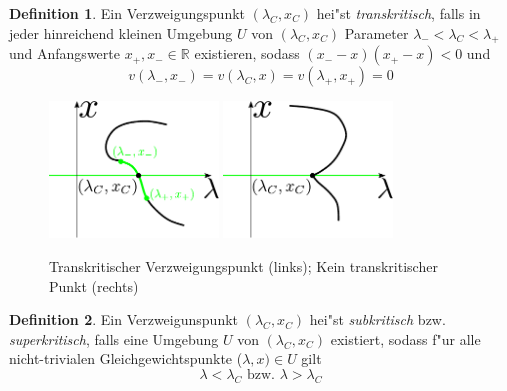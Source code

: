 \documentclass[a4paper, 13pt]{scrreprt}
\theoremstyle{definition} \newtheorem{definition}{Definition}[section]
\newcommand{\RR}{\mathbb{R}}
\begin{document}
\begin{definition}
Ein Verzweigungspunkt $(\lambda_C, x_C)$ hei"st \emph{transkritisch}, falls in jeder hinreichend kleinen Umgebung $U$ von $(\lambda_C, x_C)$ Parameter $\lambda_- < \lambda_C < \lambda_+$ und Anfangswerte $x_+, x_- \in \RR$ existieren, sodass $(x_- - x)(x_+ - x) < 0$ und 
$$ v(\lambda_-, x_-) = v(\lambda_C, x) = v(\lambda_+, x_+) = 0$$
\end{definition}
\begin{figure}[htpb]
		\centering
		\includegraphics[width=0.4\textwidth]{img/bifurkation/transkritischer_vp.pdf}
		\includegraphics[width=0.4\textwidth]{img/bifurkation/nicht_transkritischer_vp.pdf}
		\caption{Transkritischer Verzweigungspunkt (links); Kein transkritischer Punkt (rechts)}
\end{figure}

\begin{definition}
Ein Verzweigunspunkt $(\lambda_C, x_C)$ hei"st \emph{subkritisch} bzw. \emph{superkritisch}, falls eine Umgebung $U$ von $(\lambda_C, x_C)$ existiert, sodass f"ur alle nicht-trivialen Gleichgewichtspunkte ($\lambda, x) \in U$ gilt
$$ \lambda < \lambda_C \mbox{ bzw. } \lambda > \lambda_C$$
\end{definition}
\end{document}
